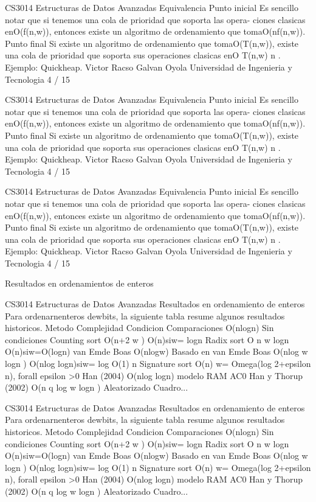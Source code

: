 \begin{description}[leftmargin=!,labelwidth=4.2em,style=nextline]
\item[Pag. 9] CS3014 Estructuras de Datos Avanzadas Equivalencia Punto inicial Es sencillo notar que si tenemos una cola de prioridad que soporta las opera- ciones clasicas enO(f(n,w)), entonces existe un algoritmo de ordenamiento que tomaO(nf(n,w)). Punto final Si existe un algoritmo de ordenamiento que tomaO(T(n,w)), existe una cola de prioridad que soporta sus operaciones clasicas enO T(n,w) n . Ejemplo: Quickheap. Victor Racso Galvan Oyola Universidad de Ingenieria y Tecnologia 4 / 15
\item[Pag. 10] CS3014 Estructuras de Datos Avanzadas Equivalencia Punto inicial Es sencillo notar que si tenemos una cola de prioridad que soporta las opera- ciones clasicas enO(f(n,w)), entonces existe un algoritmo de ordenamiento que tomaO(nf(n,w)). Punto final Si existe un algoritmo de ordenamiento que tomaO(T(n,w)), existe una cola de prioridad que soporta sus operaciones clasicas enO T(n,w) n . Ejemplo: Quickheap. Victor Racso Galvan Oyola Universidad de Ingenieria y Tecnologia 4 / 15
\item[Pag. 11] CS3014 Estructuras de Datos Avanzadas Equivalencia Punto inicial Es sencillo notar que si tenemos una cola de prioridad que soporta las opera- ciones clasicas enO(f(n,w)), entonces existe un algoritmo de ordenamiento que tomaO(nf(n,w)). Punto final Si existe un algoritmo de ordenamiento que tomaO(T(n,w)), existe una cola de prioridad que soporta sus operaciones clasicas enO T(n,w) n . Ejemplo: Quickheap. Victor Racso Galvan Oyola Universidad de Ingenieria y Tecnologia 4 / 15
\item[Pag. 12] Resultados en ordenamientos de enteros
\item[Pag. 13] CS3014 Estructuras de Datos Avanzadas Resultados en ordenamiento de enteros Para ordenarnenteros dewbits, la siguiente tabla resume algunos resultados historicos. Metodo Complejidad Condicion Comparaciones O(nlogn) Sin condiciones Counting sort O(n+2 w ) O(n)siw= logn Radix sort O n w logn O(n)siw=O(logn) van Emde Boas O(nlogw) Basado en van Emde Boas O(nlog w logn ) O(nlog logn)siw= log O(1) n Signature sort O(n) w= Omega(log 2+epsilon n), forall epsilon >0 Han (2004) O(nlog logn) modelo RAM AC0 Han y Thorup (2002) O(n q log w logn ) Aleatorizado Cuadro...
\item[Pag. 14] CS3014 Estructuras de Datos Avanzadas Resultados en ordenamiento de enteros Para ordenarnenteros dewbits, la siguiente tabla resume algunos resultados historicos. Metodo Complejidad Condicion Comparaciones O(nlogn) Sin condiciones Counting sort O(n+2 w ) O(n)siw= logn Radix sort O n w logn O(n)siw=O(logn) van Emde Boas O(nlogw) Basado en van Emde Boas O(nlog w logn ) O(nlog logn)siw= log O(1) n Signature sort O(n) w= Omega(log 2+epsilon n), forall epsilon >0 Han (2004) O(nlog logn) modelo RAM AC0 Han y Thorup (2002) O(n q log w logn ) Aleatorizado Cuadro...

\end{description}
